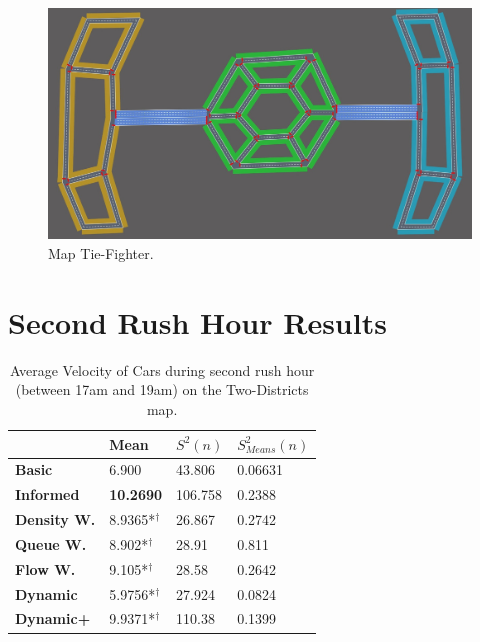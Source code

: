 \documentclass[11pt]{article}
\begin{document}
\begin{figure}[h]
	\includegraphics[width=\linewidth]{img/tie.jpeg}
	\caption{Map Tie-Fighter.}
\end{figure}

\clearpage
\section{Second Rush Hour Results}
\begin{table}[H]
\centering
\caption{Average Velocity of Cars during second rush hour (between 17am and 19am) on the Two-Districts map.}
\label{my-label}
\begin{tabular}{l|l|l|l|}
\textbf{}                 & \textbf{Mean} & \textbf{$S^2(n)$} & \textbf{$S_{Means}^2(n)$} \\
\hline\textbf{Basic}      & 6.900           & 43.806            & 0.06631                    \\
\textbf{Informed}   & \textbf{10.2690} & 106.758           & 0.2388                     \\
\hline\textbf{Density W.} & 8.9365*$^\dagger$           & 26.867            & 0.2742                     \\
\textbf{Queue W.}   & 8.902*$^\dagger$            & 28.91             & 0.811                      \\
\textbf{Flow W.}    & 9.105*$^\dagger$            & 28.58             & 0.2642                     \\
\textbf{Dynamic}    & 5.9756*$^\dagger$          & 27.924            & 0.0824                     \\
\textbf{Dynamic+}   & 9.9371*$^\dagger$           & 110.38            & 0.1399                    
\end{tabular}
\end{table}
\end{document}
